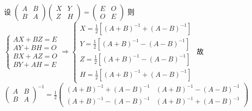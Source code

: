 	 \paragraph{} %
		 设 $\begin{pmatrix}
				 A & B \\
				 B & A
			 \end{pmatrix}
			 \begin{pmatrix}
				 X & Y \\
				 Z & H
			 \end{pmatrix} = \begin{pmatrix}
				 E & O \\
				 O & E
			 \end{pmatrix}$
		 则 $\begin{cases}
				 AX+BZ=E \\
				 AY+BH=O \\
				 BX+AZ=O \\
				 BY+AH=E
			 \end{cases} \Rightarrow \begin{cases}
				 X=\frac{1}{2}[(A+B)^{-1}+(A-B)^{-1}] \\
				 Y=\frac{1}{2}[(A+B)^{-1}-(A-B)^{-1}] \\
				 Z=\frac{1}{2}[(A+B)^{-1}-(A-B)^{-1}] \\
				 H=\frac{1}{2}[(A+B)^{-1}+(A-B)^{-1}]
			 \end{cases}$
		 故 $\begin{pmatrix}
				 A & B \\
				 B & A
			 \end{pmatrix}^{-1} = \frac{1}{2}\begin{pmatrix}
				 (A+B)^{-1}+(A-B)^{-1} & (A+B)^{-1}-(A-B)^{-1} \\
				 (A+B)^{-1}-(A-B)^{-1} & (A+B)^{-1}+(A-B)^{-1}
			 \end{pmatrix}$


 \subsection{} %


